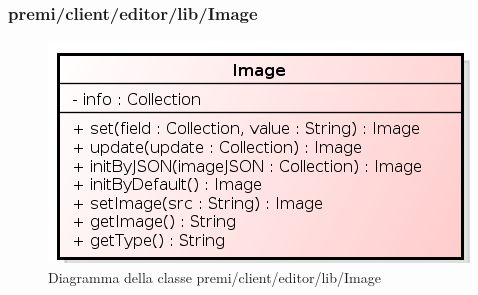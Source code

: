 \subsubsection{premi/client/editor/lib/Image}
\begin{figure}[h]
\begin{center}
\includegraphics[scale=0.40]{img/diacla/Image.png}
\caption{Diagramma della classe premi/client/editor/lib/Image}
\end{center}
\end{figure}

